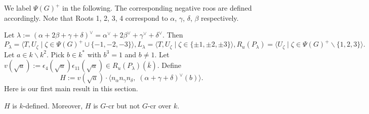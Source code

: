 We label $\Psi(G)^{+}$ in the following. The corresponding negative roos are defined accordingly. Note that Roots 1, 2, 3, 4 correspond to $\alpha$, $\gamma$, $\delta$, $\beta$ respectively.
\begin{table}[!h]
\begin{center}
\end{center}
\end{table}   
Let
$\lambda:=(\alpha+2\beta+\gamma+\delta)^{\vee}=\alpha^{\vee}+2\beta^{\vee}+\gamma^{\vee}+\delta^{\vee}$. 
Then 
$
P_\lambda=\langle T, U_{\zeta}\mid \zeta\in \Psi(G)^{+}\cup \{-1,-2,-3\} \rangle,
L_\lambda=\langle T, U_{\zeta}\mid \zeta\in \{\pm 1,\pm 2,\pm 3\} \rangle,
R_u(P_\lambda)=\langle U_{\zeta} \mid \zeta \in \Psi(G)^{+}\backslash \{1, 2, 3\} \rangle.
$
Let $a\in k\backslash k^2$. Pick $b\in k^{*}$ with $b^3=1$ and $b\neq 1$. Let $v(\sqrt a):=\epsilon_{4}(\sqrt a)\epsilon_{11}(\sqrt a)\in R_u(P_\lambda)(\overline k)$. Define
\begin{equation*}
H:=v(\sqrt a)\cdot\langle n_\alpha n_\gamma n_\delta, \; (\alpha+\gamma+\delta)^{\vee}(b) \rangle.
\end{equation*}
Here is our first main result in this section.
\begin{prop}\label{firstmain}
$H$ is $k$-defined. Moreover, $H$ is $G$-cr but not $G$-cr over $k$. 
\end{prop}

